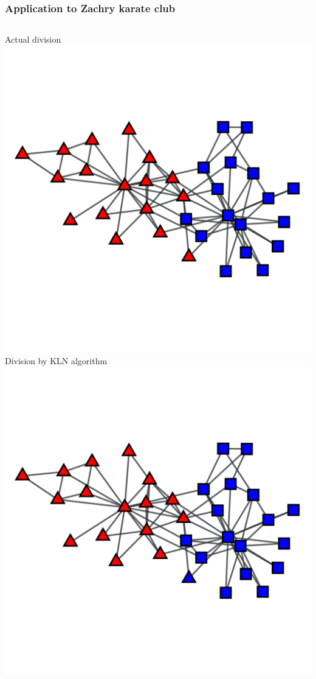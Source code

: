 \documentclass{beamer}
\begin{document}
\begin{frame}
    \frametitle{Application to Zachry karate club}
    \begin{columns}
        \centering
        Actual division
        \includegraphics[width=\columnwidth]{karate_actual.pdf}
        \pause
        \centering
        Division by KLN algorithm
        \includegraphics[width=\columnwidth]{karate_kln.pdf}
    \end{columns}
\end{frame}
\end{document}
